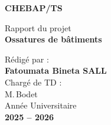 
\begin{titlepage}
  \centering
  \vspace*{1.5cm}
  {\Huge\bfseries\color{chebaprouge}CHE\color{chebapgris}BAP\color{gris}/TS\par}
  \vspace{1.2cm}
  \begin{tcolorbox}[enhanced,colback=white,colframe=bleu,boxrule=1.5pt,
    arc=0pt,sharp corners,width=12cm,halign=center]
    {\Large Rapport du projet}\\[6pt]
    {\LARGE\bfseries Ossatures de bâtiments}
  \end{tcolorbox}
  \vspace{1.5cm}
  {\large Rédigé par :}\\[8pt]
  {\Large\bfseries Fatoumata Bineta SALL}\\[1.4cm]
  {\large Chargé de TD :}\\[6pt]
  {\large M.\,Bodet}\\[2cm]
  {\large Année Universitaire}\\[6pt]
  {\Large\bfseries\color{bleu} 2025 -- 2026}
  \vfill
\end{titlepage}
